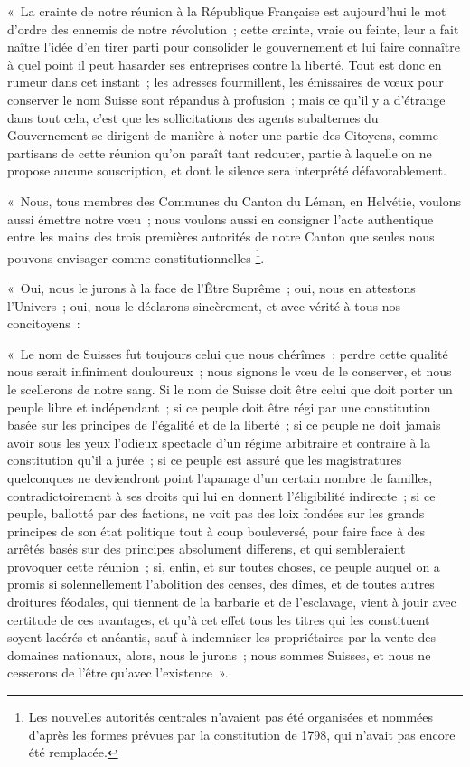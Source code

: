 \documentclass[french,twoside]{book} %
\newenvironment{quoteblock}%
  {\begin{quoting}}
  {\end{quoting}}
\newenvironment{quotebar}{%
    \def\FrameCommand{{\color{rubric!10!}\vrule width 0.5em} \hspace{0.9em}}%
    \def\OuterFrameSep{\itemsep} %
    \MakeFramed {\advance\hsize-\width \FrameRestore}
  }%
  {%
    \endMakeFramed
  }
\renewenvironment{quoteblock}%
  {%
    \savenotes
    \setstretch{0.9}
    \normalfont
    \begin{quotebar}
  }
  {%
    \end{quotebar}
    \spewnotes
  }
\begin{document}
\begin{quoteblock}
 \noindent « La crainte de notre réunion à la République Française est aujourd’hui le mot d’ordre des ennemis de notre révolution ; cette crainte, vraie ou feinte, leur a fait naître l’idée d’en tirer parti pour consolider le gouvernement et lui faire connaître à quel point il peut hasarder ses entreprises contre la liberté. Tout est donc en rumeur dans cet instant ; les adresses fourmillent, les émissaires de vœux pour conserver le nom Suisse sont répandus à profusion ; mais ce qu’il y a d’étrange dans tout cela, c’est que les sollicitations des agents subalternes du Gouvernement se dirigent de manière à noter une partie des Citoyens, comme partisans de cette réunion qu’on paraît tant redouter, partie à laquelle on ne propose aucune souscription, et dont le silence sera interprété défavorablement.\par
 « Nous, tous membres des Communes du Canton du Léman, en Helvétie, voulons aussi émettre notre vœu ; nous voulons aussi en consigner l’acte authentique entre les mains des trois premières autorités de notre Canton que seules nous pouvons envisager comme constitutionnelles \footnote{Les nouvelles autorités centrales n’avaient pas été organisées et nommées d’après les formes prévues par la constitution de 1798, qui n’avait pas encore été remplacée.}.\par
 « Oui, nous le jurons à la face de l’Être Suprême ; oui, nous en attestons l’Univers ; oui, nous le déclarons sincèrement, et avec vérité à tous nos concitoyens :\par
 « Le nom de Suisses fut toujours celui que nous chérîmes ; perdre cette qualité nous serait infiniment douloureux ; nous signons le vœu de le conserver, et nous le scellerons de notre sang. Si le nom de Suisse doit être celui que doit porter un peuple libre et indépendant ; si ce peuple doit être régi par une constitution basée sur les principes de l’égalité et de la liberté ; si ce peuple ne doit jamais avoir sous les yeux l’odieux spectacle d’un régime arbitraire et contraire à la constitution qu’il a jurée ; si ce peuple est assuré que les magistratures quelconques ne deviendront point l’apanage d’un certain nombre de familles, contradictoirement à ses droits qui lui en donnent l’éligibilité indirecte ; si ce peuple, ballotté par des factions, ne voit pas des loix fondées sur les grands principes de son état politique tout à coup bouleversé, pour faire face à des arrêtés basés sur des principes absolument differens, et qui sembleraient provoquer cette réunion ; si, enfin, et sur toutes choses, ce peuple auquel on a promis si solennellement l’abolition des censes, des dîmes, et de toutes autres droitures féodales, qui tiennent de la barbarie et de l’esclavage, vient à jouir avec certitude de ces avantages, et qu’à cet effet tous les titres qui les constituent soyent lacérés et anéantis, sauf à indemniser les propriétaires par la vente des domaines nationaux, alors, nous le jurons ; nous sommes Suisses, et nous ne cesserons de l’être qu’avec l’existence ».
 \end{quoteblock}
\end{document}

